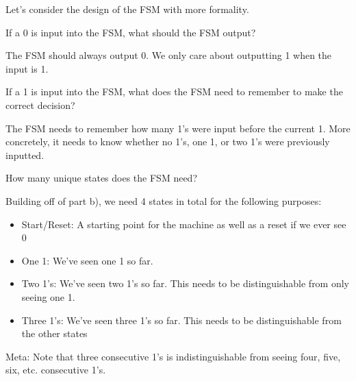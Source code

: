 \begin{blocksection}
\question
Let’s consider the design of the FSM with more formality.

\begin{parts}
\item
If a 0 is input into the FSM, what should the FSM output?
\begin{solution}[0.3in]
The FSM should always output 0. We only care about outputting 1 when the input is 1.
\end{solution}

\item
If a 1 is input into the FSM, what does the FSM need to remember to make the correct decision?
\begin{solution}[0.3in]
The FSM needs to remember how many 1’s were input before the current 1. More concretely, it needs to know whether no 1’s, one 1, or two 1’s were previously inputted.
\end{solution}

How many unique states does the FSM need?
\item
\begin{solution}
Building off of part b), we need 4 states in total for the following purposes:
\begin{itemize}
\item Start/Reset: A starting point for the machine as well as a reset if we ever see 0
\item One 1: We’ve seen one 1 so far.
\item Two 1’s: We’ve seen two 1’s so far. This needs to be distinguishable from only seeing one 1.
\item Three 1’s: We’ve seen three 1’s so far. This needs to be distinguishable from the other states
\end{itemize}
Meta: Note that three consecutive 1’s is indistinguishable from seeing four, five, six, etc. consecutive 1’s.
\end{solution}
\end{parts}
\end{blocksection}